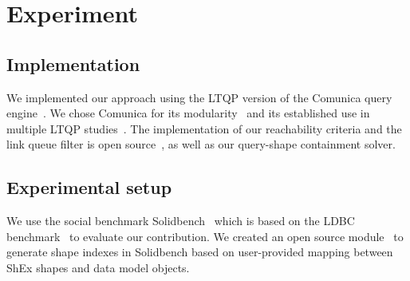 \section{Experiment}





\subsection{Implementation}
We implemented our approach using the LTQP version of the Comunica query engine~\cite{taelman_iswc_resources_comunica_2018}. 
We chose Comunica for its modularity~\cite{taelman_swj_componentsjs_2022} and its established use in multiple LTQP studies~\cite{Bogaerts2021LinkTW, Taelman2023, eschauzier_quweda_linkqueue_2023, Hanski2024, eschauzier_amw_rcubemetric_2024, tam2024opportunitiesshapebasedoptimizationlink}.
The implementation of our reachability criteria and the link queue filter is open source~, as well as our query-shape containment solver.~

\subsection{Experimental setup}
We use the social benchmark Solidbench~\cite{Taelman2023} which is based on the LDBC benchmark~\cite{Angles2020} to evaluate our contribution.
We created an open source module~ to generate shape indexes in Solidbench based on user-provided mapping between ShEx shapes and data model objects.

